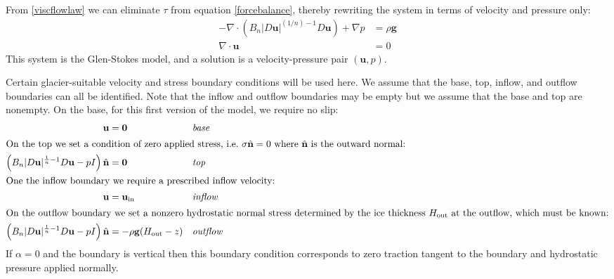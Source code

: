 \documentclass[letterpaper,final,12pt,reqno]{amsart}
\newcommand{\Div}{\nabla\cdot}
\newcommand{\hbn}{\hat{\mathbf{n}}}
\newcommand{\bg}{\mathbf{g}}
\newcommand{\bu}{\mathbf{u}}
\newcommand{\bzero}{\bm{0}}
\begin{document}
From \eqref{viscflowlaw} we can eliminate $\tau$ from equation \eqref{forcebalance}, thereby rewriting the system in terms of velocity and pressure only:
\begin{align}
- \nabla \cdot \left(B_n |D\bu|^{(1/n) - 1} D\bu\right) + \nabla p &= \rho \mathbf{g} \label{stokes} \\
\Div \bu &= 0 \label{incompagain}
\end{align}
This system is the Glen-Stokes model, and a solution is a velocity-pressure pair $(\bu,p)$.

Certain glacier-suitable velocity and stress boundary conditions will be used here.  We assume that the base, top, inflow, and outflow boundaries can all be identified.  Note that the inflow and outflow boundaries may be empty but we assume that the base and top are nonempty.  On the base, for this first version of the model, we require no slip:
\begin{align}
\bu &= \bzero  &&\text{\emph{base}} \label{basebc} \\
\intertext{On the top we set a condition of zero applied stress, i.e.~$\sigma\hbn=0$ where $\hbn$ is the outward normal:}
\left(B_n |D\bu|^{\frac{1}{n} - 1} D\bu - pI\right) \hbn &= \bzero  &&\text{\emph{top}} \label{topbc} \\
\intertext{One the inflow boundary we require a prescribed inflow velocity:}
\bu &= \bu_{\text{in}}  &&\text{\emph{inflow}} \label{inflowbc} \\
\intertext{On the outflow boundary we set a nonzero hydrostatic normal stress determined by the ice thickness $H_{\text{out}}$ at the outflow, which must be known:}
\left(B_n |D\bu|^{\frac{1}{n} - 1} D\bu - pI\right) \hbn &= -\rho \bg (H_{\text{out}}-z) &&\text{\emph{outflow}} \label{outflowbc}
\end{align}
If $\alpha=0$ and the boundary is vertical then this boundary condition corresponds to zero traction tangent to the boundary and hydrostatic pressure applied normally.
\end{document}
